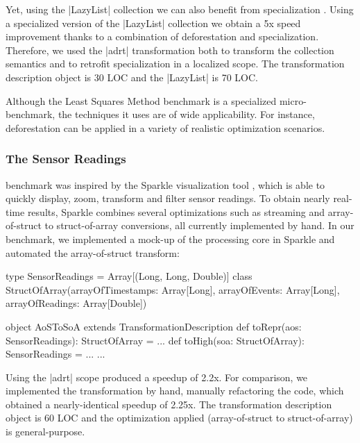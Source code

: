 Yet, using the |LazyList| collection we can also benefit from specialization \cite{iuli-thesis}. Using a specialized version of the |LazyList| collection we obtain a 5x speed improvement thanks to a combination of deforestation and specialization. Therefore, we used the |adrt| transformation both to transform the collection semantics and to retrofit specialization in a localized scope. The transformation description object is 30 LOC and the |LazyList| is 70 LOC.

Although the Least Squares Method benchmark is a specialized micro-benchmark, the techniques it uses are of wide applicability. For instance, deforestation can be applied in a variety of realistic optimization scenarios.



\subsubsection{The Sensor Readings} benchmark was inspired by the Sparkle visualization tool \cite{sparkle}, which is able to quickly display, zoom, transform and filter sensor readings. To obtain nearly real-time results, Sparkle combines several optimizations such as streaming and array-of-struct to struct-of-array conversions, all currently implemented by hand. In our benchmark, we implemented a mock-up of the processing core in Sparkle and automated the array-of-struct transform:

\begin{lstlisting-nobreak}
type SensorReadings = Array[(Long, Long, Double)]
class StructOfArray(arrayOfTimestamps: Array[Long],
                           arrayOfEvents:     Array[Long],
                           arrayOfReadings:   Array[Double])

object AoSToSoA extends TransformationDescription {
  def toRepr(aos: SensorReadings): StructOfArray = ...
  def toHigh(soa: StructOfArray): SensorReadings = ...
  ...
}
\end{lstlisting-nobreak}

Using the |adrt| scope produced a
speedup of 2.2x.
For comparison, we implemented the transformation by hand, manually refactoring the code, which obtained a nearly-identical speedup of 2.25x.
The transformation description object is 60 LOC and the optimization applied (array-of-struct to struct-of-array) is general-purpose.


